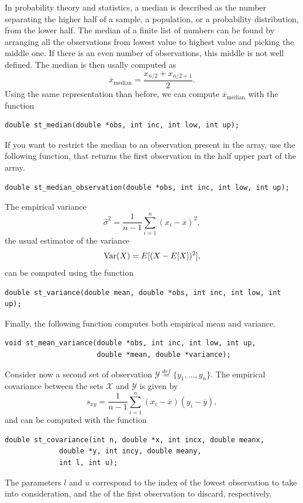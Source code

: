 In probability theory and statistics, a median is described as the
number separating the higher half of a sample, a population, or a
probability distribution, from the lower half. The median of a finite
list of numbers can be found by arranging all the observations from
lowest value to highest value and picking the middle one. If there is
an even number of observations, this middle is not well defined.
The median is then usally computed as
\[
\overline{x}_{\mbox{median}} = \frac{x_{n/2}+x_{n/2+1}}{2}.
\]
Using the same representation than before, we can compute
$\overline{x}_{\mbox{median}}$ with the function
\begin{verbatim}
double st_median(double *obs, int inc, int low, int up);
\end{verbatim}
If you want to restrict the median to an observation present in the
array, use the following function, that returns the first observation
in the half upper part of the array.
\begin{verbatim}
double st_median_observation(double *obs, int inc, int low, int up);
\end{verbatim}

The empirical variance
\[
\hat{\sigma}^2 = \frac{1}{n-1}\sum_{i=1}^n(x_i - \overline{x})^2,
\]
the usual estimator of the variance
\[
\mbox{Var}(X) = E[(X - E[X])^2],
\]
can be computed using the function
\begin{verbatim}
double st_variance(double mean, double *obs, int inc, int low, int up);
\end{verbatim}
Finally, the following function computes both empirical mean and variance.
\begin{verbatim}
void st_mean_variance(double *obs, int inc, int low, int up,
                      double *mean, double *variance);
\end{verbatim}
Consider now a second set of observation $\mathcal{Y} \overset{def}{=}
\lbrace y_1,\ldots,y_n \rbrace$.
The empirical covariance between the sets $\mathcal{X}$ and
$\mathcal{Y}$ is given by
\[
s_{xy} = \frac{1}{n-1} \sum_{i = 1}^n (x_i-\overline{x})(y_i-\overline{y}),
\]
and can be computed with the function
\begin{verbatim}
double st_covariance(int n, double *x, int incx, double meanx,
		     double *y, int incy, double meany,
		     int l, int u);
\end{verbatim}
The parameters $l$ and $u$ correspond to the index of the lowest
observation to take into consideration, and the of the first
observation to discard, respectively.

